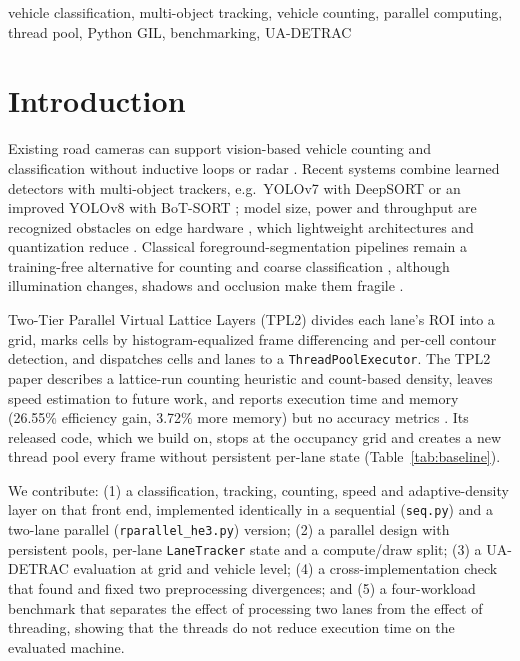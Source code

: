 \documentclass[conference]{IEEEtran}
\newcommand{\code}[1]{\texttt{#1}}
\begin{document}
\begin{IEEEkeywords}
vehicle classification, multi-object tracking, vehicle counting,
parallel computing, thread pool, Python GIL, benchmarking, UA-DETRAC
\end{IEEEkeywords}

\section{Introduction}
\label{sec:intro}
Existing road cameras can support vision-based vehicle counting and
classification without inductive loops or radar \cite{crouzil2016}.
Recent systems combine learned detectors with multi-object trackers,
e.g.\ YOLOv7 with DeepSORT \cite{lian2025} or an improved YOLOv8 with
BoT-SORT \cite{liu2025}; model size, power and throughput are recognized
obstacles on edge hardware \cite{zhai2023}, which lightweight
architectures and quantization reduce \cite{chang2025,macko2025}.
Classical foreground-segmentation pipelines remain a training-free
alternative for counting and coarse classification \cite{unzueta2012},
although illumination changes, shadows and occlusion make them fragile
\cite{abbas2021,chen2020}.

Two-Tier Parallel Virtual Lattice Layers (TPL2) \cite{baseline} divides
each lane's ROI into a grid, marks cells by histogram-equalized frame
differencing and per-cell contour detection, and dispatches cells and
lanes to a \code{ThreadPoolExecutor}. The TPL2 paper describes a
lattice-run counting heuristic and count-based density, leaves speed
estimation to future work, and reports execution time and memory
(26.55\% efficiency gain, 3.72\% more memory) but no accuracy metrics
\cite{baseline,muthuraja2026}. Its released code, which we build on,
stops at the occupancy grid and creates a new thread pool every frame
without persistent per-lane state (Table~\ref{tab:baseline}).

We contribute: (1) a classification, tracking, counting, speed and
adaptive-density layer on that front end, implemented identically in a
sequential (\code{seq.py}) and a two-lane parallel
(\code{rparallel\_he3.py}) version; (2) a parallel design with
persistent pools, per-lane \code{LaneTracker} state and a compute/draw
split; (3) a UA-DETRAC evaluation at grid and vehicle level;
(4) a cross-implementation check that found and fixed two preprocessing
divergences; and (5) a four-workload benchmark that separates the effect
of processing two lanes from the effect of threading, showing that the
threads do not reduce execution time on the evaluated machine.
\end{document}
